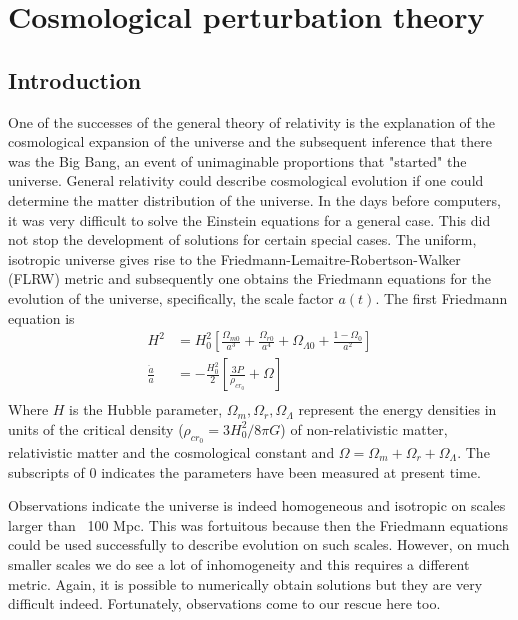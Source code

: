 \documentclass[12pt,a4paper,twoside]{book}
\begin{document}
\chapter{Cosmological perturbation theory}
	\section{Introduction}
		One of the successes of the general theory of relativity is the explanation of the cosmological expansion of the universe and the subsequent inference that there was the Big Bang, an event of unimaginable proportions that "started" the universe. General relativity could describe cosmological evolution if one could determine the matter distribution of the universe. In the days before computers, it was very difficult to solve the Einstein equations for a general case. This did not stop the development of solutions for certain special cases. The uniform, isotropic universe gives rise to the Friedmann-Lemaitre-Robertson-Walker (FLRW) metric and subsequently one obtains the Friedmann equations for the evolution of the universe, specifically, the scale factor $a(t)$. The first Friedmann equation is
		\begin{equation}
			\begin{aligned}
				H^2&=H_0^2\left[\frac{\Omega_{m0}}{a^3}+
													\frac{{\Omega}_{r0}}{a^4}+
													{\Omega}_{\Lambda 0}+
													\frac{1-\Omega_0}{a^2}\right]\\
				\frac{\ddot{a}}{a}&=-\frac{H_0^2}{2}[\frac{3P}{\rho_{cr_0}}+\Omega]\\
			\end{aligned}
		\end{equation}
		Where $H$ is the Hubble parameter, $\Omega_{m},\Omega_{r},\Omega_{\Lambda}$ represent the energy densities in units of the critical density ($\rho_{cr_0}=3H_0^2/8\pi G$) of non-relativistic matter, relativistic matter and the cosmological constant and $\Omega=\Omega_{m}+\Omega_{r}+\Omega_{\Lambda }$. The subscripts of 0 indicates the parameters have been measured at present time.
		
		Observations indicate the universe is indeed homogeneous and isotropic on scales larger than ~100 Mpc. This was fortuitous because then the Friedmann equations could be used successfully to describe evolution on such scales. However, on much smaller scales we do see a lot of inhomogeneity and this requires a different metric. Again, it is possible to numerically obtain solutions but they are very difficult indeed. Fortunately, observations come to our rescue here too.
		
\end{document}
